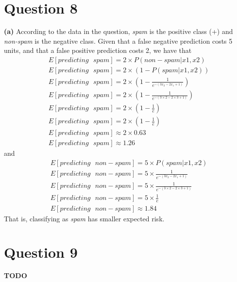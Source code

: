 \documentclass[leqno]{article}
\begin{document}
\section*{Question 8} %
\noindent \textbf{(a)} According to the data in the question, \textit{spam} is the positive class (+) and \textit{non-spam} is the negative class. Given that a false negative 
prediction costs 5 units, and that a false positive prediction costs 2, we have that
\begin{equation*}
\begin{split}
&E[predicting\mbox{ }spam] = 2 \times P(non-spam|x1, x2)\\
&E[predicting\mbox{ }spam] = 2 \times (1 - P(spam|x1, x2))\\
&E[predicting\mbox{ }spam] = 2 \times (1 - \frac{1}{e^{-(3x_2 - 2x_1 + 1)}})\\
&E[predicting\mbox{ }spam] = 2 \times (1 - \frac{1}{e^{-(3 \times 2 - 2 \times 3 + 1)}})\\
&E[predicting\mbox{ }spam] = 2 \times (1 - \frac{1}{e})\\
&E[predicting\mbox{ }spam] = 2 \times (1 - \frac{1}{e})\\
&E[predicting\mbox{ }spam] \approx 2 \times 0.63\\
&E[predicting\mbox{ }spam] \approx 1.26
\end{split}
\end{equation*} 
and
\begin{equation*}
\begin{split}
&E[predicting\mbox{ }non-spam] = 5 \times P(spam|x1, x2)\\
&E[predicting\mbox{ }non-spam] = 5 \times \frac{1}{e^{-(3x_2 - 2x_1 + 1)}}\\
&E[predicting\mbox{ }non-spam] = 5 \times \frac{1}{e^{-(3 \times 2 - 2 \times 3 + 1)}}\\
&E[predicting\mbox{ }non-spam] = 5 \times \frac{1}{e}\\
&E[predicting\mbox{ }non-spam] \approx 1.84
\end{split}
\end{equation*} 
That is, classifying as \textit{spam} has smaller expected risk.

\section*{Question 9} \textbf{TODO}
\end{document}
